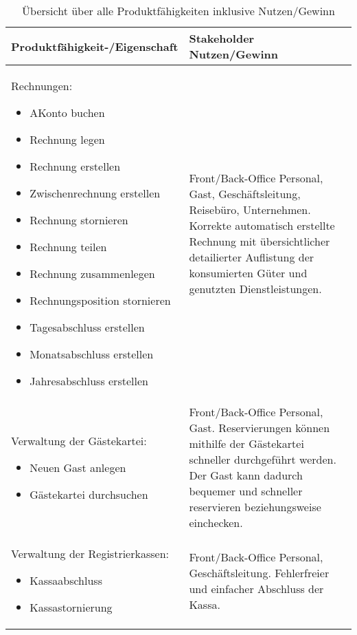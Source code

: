 \documentclass[../../Pflichtenheft.tex]{subfiles}
\begin{document}
    \begin{longtable}{|p{7cm}|p{7cm}|}
        \caption{Übersicht über alle Produktfähigkeiten inklusive Nutzen/Gewinn}
        \hline
        Produktfähigkeit-/Eigenschaft & Stakeholder Nutzen/Gewinn \\ \hline
        Rechnungen:
        \begin{itemize}
		    \item AKonto buchen
            \item Rechnung legen
            \item Rechnung erstellen
            \item Zwischenrechnung erstellen
            \item Rechnung stornieren
            \item Rechnung teilen
            \item Rechnung zusammenlegen
            \item Rechnungsposition stornieren
            \item Tagesabschluss erstellen
            \item Monatsabschluss erstellen
            \item Jahresabschluss erstellen
        \end{itemize}
        & Front/Back-Office Personal, Gast, Geschäftsleitung, Reisebüro, Unternehmen.
		Korrekte automatisch erstellte Rechnung mit übersichtlicher detailierter
		Auflistung der konsumierten Güter und genutzten Dienstleistungen.
        \\ \hline
        Verwaltung der Gästekartei:
        \begin{itemize}
            \item Neuen Gast anlegen
            \item Gästekartei durchsuchen
        \end{itemize}
        & Front/Back-Office Personal, Gast. Reservierungen können mithilfe der Gästekartei
		schneller durchgeführt werden. Der Gast kann dadurch bequemer und schneller
		reservieren beziehungsweise einchecken.
		\\ \hline
        Verwaltung der Registrierkassen:
        \begin{itemize}
            \item Kassaabschluss
            \item Kassastornierung
        \end{itemize}
        & Front/Back-Office Personal, Geschäftsleitung. Fehlerfreier und einfacher
		Abschluss der Kassa.

\end{longtable}
\end{document}
